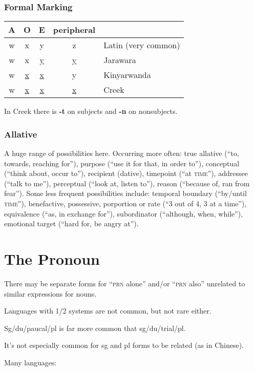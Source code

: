 \documentclass[11pt]{article}
\newcommand{\LL}[1]{\textbf{#1}}  %
\newcommand{\I}[1]{\textsc{#1}}   %
\begin{document}
\subsubsection{Formal Marking}
\begin{center}
  \begin{tabular}{ccccl}
    A & O & E & peripheral \\
    \hline
    w & x & y & z & Latin (very common) \\
    w & x & \uline{y} & \uline{y} & Jarawara \\
    w & \uline{x} & \uline{x} & y & Kinyarwanda \\
    w & \uline{x} & \uline{x} & \uline{x} & Creek
  \end{tabular}
\end{center}

\noindent In Creek there is \LL{-t} on subjects and \LL{-n} on
nonsubjects. 

\subsubsection{Allative} A huge range of possibilities here.
Occurring more often: true allative (``to, towards, reaching for''),
purpose (``use it for that, in order to''), conceptual (``think about,
occur to''), recipient (dative), timepoint (``at \I{time}''),
addressee (``talk to me''), perceptual (``look at, listen to''),
reason (``because of, ran from fear'').  Some less frequent
possibilities include: temporal boundary (``by/until \I{time}''),
benefactive, possessive, porportion or rate (``3 out of 4, 3 at a
time''), equivalence (``as, in exchange for''), subordinator
(``although, when, while''), emotional target (``hard for, be angry
at'').


\section{The Pronoun}
There may be separate forms for ``\I{prn} alone'' and/or ``\I{prn}
also'' unrelated to similar expressions for nouns.

Languages with 1/2 systems are not common, but not rare either.

Sg/du/paucal/pl is far more common that sg/du/trial/pl.

It's not especially common for sg and pl forms to be related (as in
Chinese).

Many languages:
\end{document}
